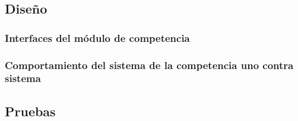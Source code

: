 \clearpage
\subsection{Diseño}

\subsubsection{Interfaces del módulo de competencia}

    
    
    
    
    
    
    
    
    
    
    
    
    
    
    
    


    

\clearpage
\subsubsection{Comportamiento del sistema de la competencia uno contra sistema}
    

\subsection{Pruebas}

